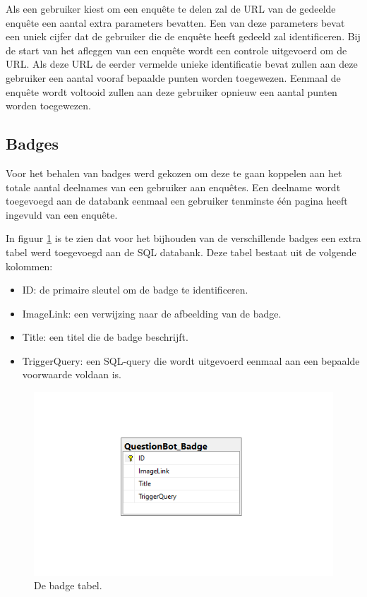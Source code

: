 Als een gebruiker kiest om een enquête te delen zal de URL van de gedeelde enquête een aantal extra parameters bevatten. Een van deze parameters bevat een uniek cijfer dat de gebruiker die de enquête heeft gedeeld zal identificeren. Bij de start van het afleggen van een enquête wordt een controle uitgevoerd om de URL. Als deze URL de eerder vermelde unieke identificatie bevat zullen aan deze gebruiker een aantal vooraf bepaalde punten worden toegewezen. Eenmaal de enquête wordt voltooid zullen aan deze gebruiker opnieuw een aantal punten worden toegewezen.

\subsection{Badges}

Voor het behalen van badges werd gekozen om deze te gaan koppelen aan het totale aantal deelnames van een gebruiker aan enquêtes. Een deelname wordt toegevoegd aan de databank eenmaal een gebruiker tenminste één pagina heeft ingevuld van een enquête.

In figuur \ref{fig:dbbadge} is te zien dat voor het bijhouden van de verschillende badges een extra tabel werd toegevoegd aan de SQL databank. Deze tabel bestaat uit de volgende kolommen:

\begin{itemize}
    \item ID: de primaire sleutel om de badge te identificeren.
    \item ImageLink: een verwijzing naar de afbeelding van de badge.
    \item Title: een titel die de badge beschrijft.
    \item TriggerQuery: een SQL-query die wordt uitgevoerd eenmaal aan een bepaalde voorwaarde voldaan is.
\end{itemize}

\begin{figure}
    \includegraphics[width=\linewidth]{DBBadge2.png}
    \caption{De badge tabel.}
    \label{fig:dbbadge}
\end{figure}

